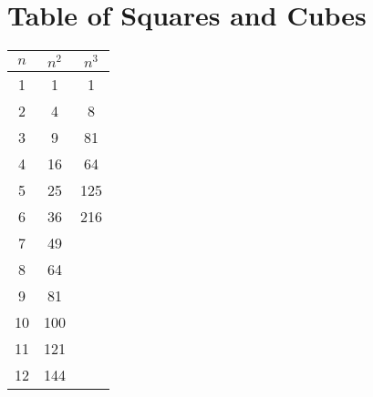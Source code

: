 \section{Table of Squares and Cubes}

\begin{center}
    \begin{tabular}{ccc}
        \toprule
        $n$ & $n^2$ & $n^3$ \\
        \midrule
        1 & 1 & 1 \\
        2 & 4 & 8 \\
        3 & 9 & 81 \\
        4 & 16 & 64 \\
        5 & 25 & 125 \\
        6 & 36 & 216 \\
        7 & 49 &  \\
        8 & 64 &  \\
        9 & 81 &  \\
        10 & 100 &  \\
        11 & 121 &  \\
        12 & 144 &  \\
        \bottomrule
    \end{tabular}
\end{center}
